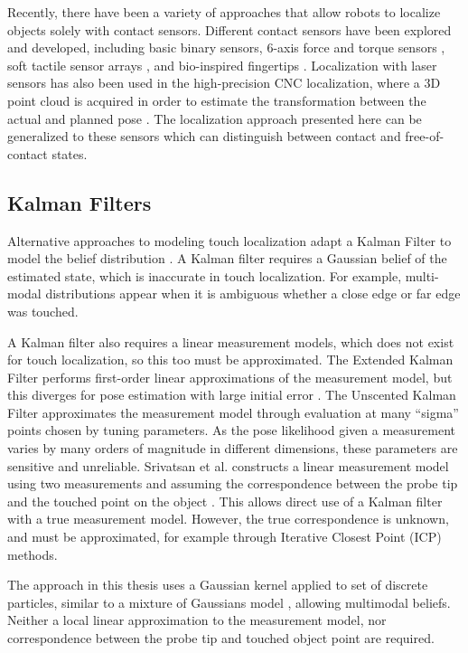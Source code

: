\documentclass[../thesis.tex]{subfiles}
\begin{document}
Recently, there have been a variety of approaches that allow robots to localize objects solely with contact sensors. Different contact sensors have been explored and developed, including basic binary sensors, 6-axis force and torque sensors \cite{del2012control}, soft tactile sensor arrays \cite{hammond2012soft}, and bio-inspired fingertips \cite{fishel2012sensing}. Localization with laser sensors has also been used in the high-precision CNC localization, where a 3D point cloud is acquired in order to estimate the transformation between the actual and planned pose \cite{rajaraman2013automated}.
The localization approach presented here can be generalized to these sensors which can distinguish between contact and free-of-contact states.



\subsection{Kalman Filters}
Alternative approaches to modeling touch localization adapt a Kalman Filter to model the belief distribution \cite{Choukroun2006}\cite{Srivatsan}.
A Kalman filter requires a Gaussian belief of the estimated state, which is inaccurate in touch localization. 
For example, multi-modal distributions appear when it is ambiguous whether a close edge or far edge was touched. %

A Kalman filter also requires a linear measurement models, which does not exist for touch localization, so this too must be approximated.
The Extended Kalman Filter performs first-order linear approximations of the measurement model, but this diverges for pose estimation with large initial error \cite{Choukroun2006}.
The Unscented Kalman Filter approximates the measurement model through evaluation at many ``sigma'' points chosen by tuning parameters.
As the pose likelihood given a measurement varies by many orders of magnitude in different dimensions, these parameters are sensitive and unreliable.
Srivatsan et al. constructs a linear measurement model using two measurements and assuming the correspondence between the probe tip and the touched point on the object \cite{Srivatsan}.
This allows direct use of a Kalman filter with a true measurement model.
However, the true correspondence is unknown, and must be approximated, for example through Iterative Closest Point (ICP) methods.

The approach in this thesis uses a Gaussian kernel applied to set of discrete particles, similar to a mixture of Gaussians model \cite{Thrun2000}, allowing multimodal beliefs.
Neither a local linear approximation to the measurement model, nor correspondence between the probe tip and touched object point are required.
\end{document}
